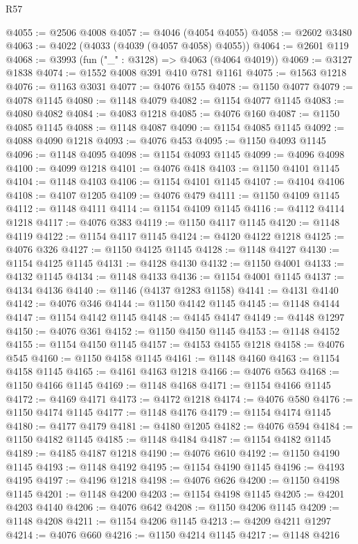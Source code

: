 \begin{lexlean}{R57}
\begin{coremodule}
@4055 := @2506 @4008
@4057 := @4046 (@4054 @4055)
@4058 := @2602 @3480
@4063 := @4022 (@4033 (@4039 (@4057 @4058) @4055))
@4064 := @2601 @119
@4068 := @3993 (fun ("_" : @3128) => @4063 (@4064 @4019))
@4069 := @3127 @1838
@4074 := @1552 @4008 @391 @410 @781 @1161
@4075 := @1563 @1218
@4076 := @1163 @3031
@4077 := @4076 @155
@4078 := @1150 @4077
@4079 := @4078 @1145
@4080 := @1148 @4079
@4082 := @1154 @4077 @1145
@4083 := @4080 @4082
@4084 := @4083 @1218
@4085 := @4076 @160
@4087 := @1150 @4085 @1145
@4088 := @1148 @4087
@4090 := @1154 @4085 @1145
@4092 := @4088 @4090 @1218
@4093 := @4076 @453
@4095 := @1150 @4093 @1145
@4096 := @1148 @4095
@4098 := @1154 @4093 @1145
@4099 := @4096 @4098
@4100 := @4099 @1218
@4101 := @4076 @418
@4103 := @1150 @4101 @1145
@4104 := @1148 @4103
@4106 := @1154 @4101 @1145
@4107 := @4104 @4106
@4108 := @4107 @1205
@4109 := @4076 @479
@4111 := @1150 @4109 @1145
@4112 := @1148 @4111
@4114 := @1154 @4109 @1145
@4116 := @4112 @4114 @1218
@4117 := @4076 @383
@4119 := @1150 @4117 @1145
@4120 := @1148 @4119
@4122 := @1154 @4117 @1145
@4124 := @4120 @4122 @1218
@4125 := @4076 @326
@4127 := @1150 @4125 @1145
@4128 := @1148 @4127
@4130 := @1154 @4125 @1145
@4131 := @4128 @4130
@4132 := @1150 @4001
@4133 := @4132 @1145
@4134 := @1148 @4133
@4136 := @1154 @4001 @1145
@4137 := @4134 @4136
@4140 := @1146 (@4137 @1283 @1158)
@4141 := @4131 @4140
@4142 := @4076 @346
@4144 := @1150 @4142 @1145
@4145 := @1148 @4144
@4147 := @1154 @4142 @1145
@4148 := @4145 @4147
@4149 := @4148 @1297
@4150 := @4076 @361
@4152 := @1150 @4150 @1145
@4153 := @1148 @4152
@4155 := @1154 @4150 @1145
@4157 := @4153 @4155 @1218
@4158 := @4076 @545
@4160 := @1150 @4158 @1145
@4161 := @1148 @4160
@4163 := @1154 @4158 @1145
@4165 := @4161 @4163 @1218
@4166 := @4076 @563
@4168 := @1150 @4166 @1145
@4169 := @1148 @4168
@4171 := @1154 @4166 @1145
@4172 := @4169 @4171
@4173 := @4172 @1218
@4174 := @4076 @580
@4176 := @1150 @4174 @1145
@4177 := @1148 @4176
@4179 := @1154 @4174 @1145
@4180 := @4177 @4179
@4181 := @4180 @1205
@4182 := @4076 @594
@4184 := @1150 @4182 @1145
@4185 := @1148 @4184
@4187 := @1154 @4182 @1145
@4189 := @4185 @4187 @1218
@4190 := @4076 @610
@4192 := @1150 @4190 @1145
@4193 := @1148 @4192
@4195 := @1154 @4190 @1145
@4196 := @4193 @4195
@4197 := @4196 @1218
@4198 := @4076 @626
@4200 := @1150 @4198 @1145
@4201 := @1148 @4200
@4203 := @1154 @4198 @1145
@4205 := @4201 @4203 @4140
@4206 := @4076 @642
@4208 := @1150 @4206 @1145
@4209 := @1148 @4208
@4211 := @1154 @4206 @1145
@4213 := @4209 @4211 @1297
@4214 := @4076 @660
@4216 := @1150 @4214 @1145
@4217 := @1148 @4216

\end{coremodule}
\end{lexlean}
